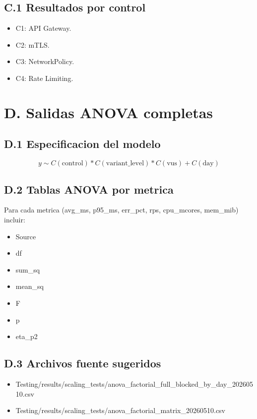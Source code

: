 \subsection{C.1 Resultados por control}
\begin{itemize}
  \item C1: API Gateway.
  \item C2: mTLS.
  \item C3: NetworkPolicy.
  \item C4: Rate Limiting.
\end{itemize}

\section{D. Salidas ANOVA completas}
\label{anx:anova}

\subsection{D.1 Especificacion del modelo}
\begin{equation*}
y \sim C(\text{control}) * C(\text{variant\_level}) * C(\text{vus}) + C(\text{day})
\end{equation*}

\subsection{D.2 Tablas ANOVA por metrica}
Para cada metrica (avg\_ms, p95\_ms, err\_pct, rps, cpu\_mcores, mem\_mib) incluir:
\begin{itemize}
  \item Source
  \item df
  \item sum\_sq
  \item mean\_sq
  \item F
  \item p
  \item eta\_p2
\end{itemize}

\subsection{D.3 Archivos fuente sugeridos}
\begin{itemize}
  \item Testing/results/scaling\_tests/anova\_factorial\_full\_blocked\_by\_day\_20260510.csv
  \item Testing/results/scaling\_tests/anova\_factorial\_matrix\_20260510.csv
\end{itemize}

